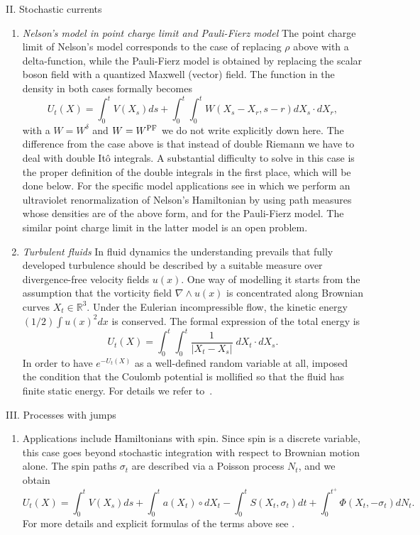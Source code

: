 \documentclass[a4paper,11pt]{article}
\begin{document}
\vspace{0.1cm}
\noindent
II. Stochastic currents
\begin{enumerate}
\item[(1)]
{\it Nelson's model in point charge limit and Pauli-Fierz model} \quad
The point charge limit of Nelson's model corresponds to the case of 
replacing $\rho$ above with a delta-function, while the Pauli-Fierz 
model is obtained by replacing the scalar boson field with a quantized
Maxwell (vector) field. The function in the density in both cases 
formally becomes 
\begin{equation}
U_t(X) = \int_0^t V(X_s) ds + \int_0^t \int_0^t W(X_s-X_r,s-r) 
dX_s \cdot dX_r,
\label{doubleito}
\end{equation}
with a $W=W^\delta$ and $W=W^{\rm PF}$ we do not write explicitly 
down here. The difference from the case above is that instead of 
double Riemann we have to deal with double It\^o integrals. A
substantial difficulty to solve in this case is the proper definition 
of the double integrals in the first place, which will be done below. 
For the specific model applications see \cite{GL} in which we perform 
an ultraviolet renormalization of Nelson's Hamiltonian by using path
measures whose densities are of the above form, and \cite{H,HL2} for the
Pauli-Fierz model. The similar point charge limit in the latter model 
is an open problem.

\item[(2)]
{\it Turbulent fluids} \quad
In fluid dynamics the understanding prevails that fully developed 
turbulence should be described by a suitable measure over
divergence-free velocity fields $u(x)$. One way of modelling it starts 
from the assumption that the vorticity field $\nabla \wedge u(x)$ is 
concentrated along Brownian curves $X_t \in \mathbb{R}^3$. Under the 
Eulerian incompressible flow, the kinetic energy $(1/2) \int u(x)^2 
dx$ is conserved. The formal expression of the total energy is
\begin{equation}\label{3.11}
U_t(X)= \int_0^t \int_0^t \frac{1}{|X_t - X_s|} \; dX_t \cdot dX_s.
\end{equation}
In order to have $e^{-U_t(X)}$ as a well-defined random variable at
all, \cite{Ffil} imposed the condition that the Coulomb potential is 
mollified so that the fluid has finite static energy. For details we
refer to~\cite{statvort,FGub,Nua,evolution,Ascona}. 
\end{enumerate}



\vspace{0.1cm}
\noindent
{III. Processes with jumps} \quad 
\begin{enumerate}
\item[]
Applications include Hamiltonians with spin. Since spin is a discrete 
variable, this case goes beyond stochastic integration with respect to
Brownian motion alone. The spin paths $\sigma_t$ are described via a 
Poisson process $N_t$, and we obtain
$$
U_t(X) = \int_0^t V(X_s) ds + \int_0^t a(X_t) \circ dX_t - 
\int_0^t S(X_t,\sigma_t) dt +\int_0^{t^+} \Phi(X_t,-\sigma_t) dN_t.
$$
For more details and explicit formulas of the terms above see
\cite{Jona,HL1}.
\end{enumerate}
\end{document}
